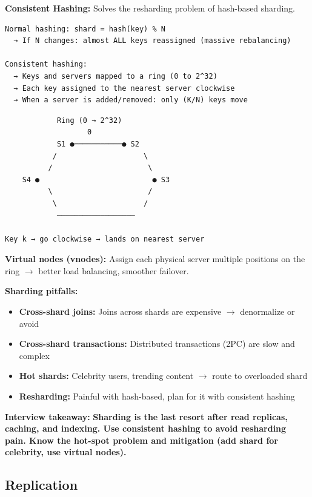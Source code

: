 \documentclass[11pt]{article}
\providecommand{\tightlist}{\setlength{\itemsep}{1pt}\setlength{\parskip}{0pt}}
\begin{document}
\textbf{Consistent Hashing:} Solves the resharding problem of hash-based sharding.

\setcodelang{}

\begin{verbatim}
Normal hashing: shard = hash(key) % N
  → If N changes: almost ALL keys reassigned (massive rebalancing)

Consistent hashing:
  → Keys and servers mapped to a ring (0 to 2^32)
  → Each key assigned to the nearest server clockwise
  → When a server is added/removed: only (K/N) keys move
\end{verbatim}

\setcodelang{}

\begin{verbatim}
            Ring (0 → 2^32)
                   0
            S1 ●───────────● S2
           /                    \
          /                      \
    S4 ●                          ● S3
          \                      /
           \                    /
            ──────────────────
            
Key k → go clockwise → lands on nearest server
\end{verbatim}

\textbf{Virtual nodes (vnodes):} Assign each physical server multiple positions on the ring \(\rightarrow\) better load balancing, smoother failover.

\textbf{Sharding pitfalls:}

\begin{itemize}
\tightlist
\item
  \textbf{Cross-shard joins:} Joins across shards are expensive \(\rightarrow\) denormalize or avoid
\item
  \textbf{Cross-shard transactions:} Distributed transactions (2PC) are slow and complex
\item
  \textbf{Hot shards:} Celebrity users, trending content \(\rightarrow\) route to overloaded shard
\item
  \textbf{Resharding:} Painful with hash-based, plan for it with consistent hashing
\end{itemize}

\textbf{Interview takeaway:} \textbf{Sharding is the last resort after read replicas, caching, and indexing. Use consistent hashing to avoid resharding pain. Know the hot-spot problem and mitigation (add shard for celebrity, use virtual nodes).}

\subsection{Replication}\label{replication}
\end{document}
